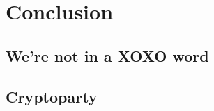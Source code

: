 \documentclass{beamer}
\begin{document}
\section{Conclusion}
\subsection{We're not in a XOXO word}
\begin{frame}
\end{frame}

\subsection{Cryptoparty}
\begin{frame}
\end{frame}
\end{document}
